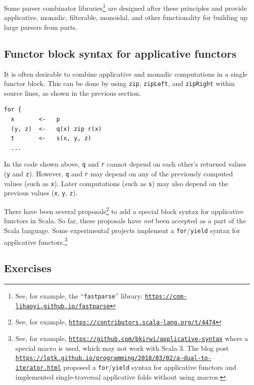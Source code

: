 Some parser combinator libraries\footnote{See, for example, the \textsf{``}\texttt{fastparse}\textsf{''} library: \texttt{\href{https://com-lihaoyi.github.io/fastparse}{https://com-lihaoyi.github.io/fastparse}}}
are designed after these principles and provide applicative, monadic,
filterable, monoidal, and other functionality for building up large
parsers from parts.

\subsection{Functor block syntax for applicative functors\label{subsec:Functor-block-syntax-for-applicative}}

It is often desirable to combine applicative and monadic computations
in a single functor block. This can be done by using \lstinline!zip!,
\lstinline!zipLeft!, and \lstinline!zipRight! within source lines,
as shown in the previous section.
\begin{lstlisting}
for {
  x       <-   p
  (y, z)  <-   q(x) zip r(x)
  t       <-   s(x, y, z)
  ...
\end{lstlisting}
In the code shown above, \lstinline!q! and \lstinline!r! cannot
depend on each other\textsf{'}s returned values (\lstinline!y! and \lstinline!z!).
However, \lstinline!q! and \lstinline!r! may depend on any of the
previously computed values (such as \lstinline!x!). Later computations
(such as \lstinline!s!) may also depend on the previous values (\lstinline!x!,
\lstinline!y!, \lstinline!z!).

There have been several proposals\footnote{See, for example, \texttt{\href{https://contributors.scala-lang.org/t/4474}{https://contributors.scala-lang.org/t/4474}}}
to add a special block syntax for applicative functors in Scala. So
far, these proposals have \emph{not} been accepted as a part of the
Scala language. Some experimental projects implement a \lstinline!for!/\lstinline!yield!
syntax for applicative functors.\footnote{See, for example, \texttt{\href{https://github.com/bkirwi/applicative-syntax}{https://github.com/bkirwi/applicative-syntax}}
where a special macro is used, which may not work with Scala 3. The
blog post \texttt{\href{https://lptk.github.io/programming/2018/03/02/a-dual-to-iterator.html}{https://lptk.github.io/programming/2018/03/02/a-dual-to-iterator.html}}
proposed a \lstinline!for!/\lstinline!yield! syntax for applicative
functors and implemented single-traversal applicative folds without
using macros.}

\subsection{Exercises}

